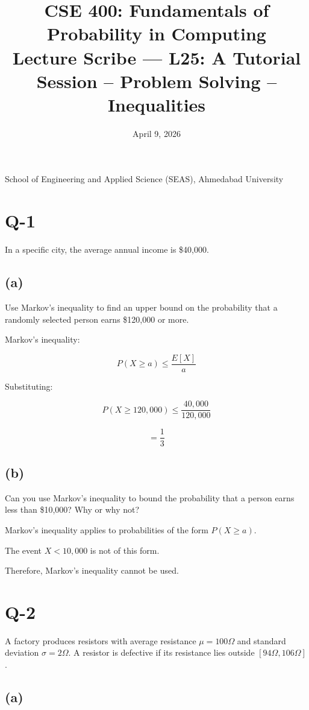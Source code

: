 \documentclass[12pt]{article}
\title{CSE 400: Fundamentals of Probability in Computing\\
Lecture Scribe — L25: A Tutorial Session – Problem Solving – Inequalities}
\date{April 9, 2026}
\begin{document}
\maketitle

School of Engineering and Applied Science (SEAS), Ahmedabad University

\section*{Q-1}

In a specific city, the average annual income is \$40,000.

\subsection*{(a)}
Use Markov’s inequality to find an upper bound on the probability that a randomly selected person earns \$120,000 or more.

Markov’s inequality:

\[
P(X \ge a) \le \frac{E[X]}{a}
\]

Substituting:

\[
P(X \ge 120,000) \le \frac{40,000}{120,000}
\]

\[
= \frac{1}{3}
\]

\subsection*{(b)}

Can you use Markov’s inequality to bound the probability that a person earns less than \$10,000? Why or why not?

Markov’s inequality applies to probabilities of the form $P(X \ge a)$.

The event $X < 10,000$ is not of this form.

Therefore, Markov’s inequality cannot be used.

\section*{Q-2}

A factory produces resistors with average resistance $\mu = 100\Omega$ and standard deviation $\sigma = 2\Omega$. A resistor is defective if its resistance lies outside $[94\Omega, 106\Omega]$.

\subsection*{(a)}
\end{document}
